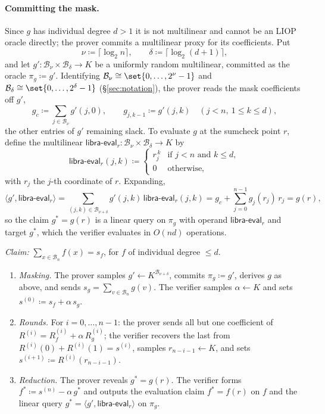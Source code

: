 \documentclass{article}
\theoremstyle{definition}
\newcommand{\BB}{\mathcal{B}}
\begin{document}
\paragraph{Committing the mask.}
Since $g$ has individual degree $d > 1$ it is not multilinear and cannot be an LIOP oracle directly; the prover commits a multilinear proxy for its coefficients. Put
\[
  \nu \coloneqq \lceil \log_2 n \rceil, \qquad \delta \coloneqq \lceil \log_2 (d + 1) \rceil,
\]
and let $g' \colon \BB_\nu \times \BB_\delta \to K$ be a uniformly random multilinear, committed as the oracle $\pi_g \coloneqq g'$. Identifying $\BB_\nu \cong \set{0, \ldots, 2^\nu - 1}$ and $\BB_\delta \cong \set{0, \ldots, 2^\delta - 1}$ (\S\ref{sec:notation}), the prover reads the mask coefficients off $g'$,
\[
  g_c \coloneqq \sum_{j \in \BB_\nu} g'(j, 0), \qquad g_{j, k - 1} \coloneqq g'(j, k) \quad (j < n,\ 1 \le k \le d),
\]
the other entries of $g'$ remaining slack. To evaluate $g$ at the sumcheck point $r$, define the multilinear $\textsf{libra-eval}_r \colon \BB_\nu \times \BB_\delta \to K$ by
\[
  \textsf{libra-eval}_r(j, k) \coloneqq \begin{cases} r_j^{\,k} & \text{if } j < n \text{ and } k \le d, \\ 0 & \text{otherwise,} \end{cases}
\]
with $r_j$ the $j$-th coordinate of $r$. Expanding,
\[
  \langle g', \textsf{libra-eval}_r \rangle = \sum_{(j, k) \in \BB_{\nu + \delta}} g'(j, k)\, \textsf{libra-eval}_r(j, k) = g_c + \sum_{j = 0}^{n - 1} g_j(r_j)\, r_j = g(r),
\]
so the claim $g^* = g(r)$ is a linear query on $\pi_g$ with operand $\textsf{libra-eval}_r$ and target $g^*$, which the verifier evaluates in $O(nd)$ operations.

\begin{protocol}
\label{prot:zk-sumcheck-libra}
\emph{Claim:} $\sum_{x \in \BB_n} f(x) = s_f$, for $f$ of individual degree $\le d$.
\begin{enumerate}
\item \emph{Masking.} The prover samples $g' \gets K^{\BB_{\nu + \delta}}$, commits $\pi_g \coloneqq g'$, derives $g$ as above, and sends $s_g = \sum_{v \in \BB_n} g(v)$. The verifier samples $\alpha \gets K$ and sets $s^{(0)} \coloneqq s_f + \alpha\, s_g$.
\item \emph{Rounds.} For $i = 0, \ldots, n - 1$: the prover sends all but one coefficient of $R^{(i)} = R_f^{(i)} + \alpha\, R_g^{(i)}$; the verifier recovers the last from $R^{(i)}(0) + R^{(i)}(1) = s^{(i)}$, samples $r_{n - i - 1} \gets K$, and sets $s^{(i + 1)} \coloneqq R^{(i)}(r_{n - i - 1})$.
\item \emph{Reduction.} The prover reveals $g^* = g(r)$. The verifier forms $f^* \coloneqq s^{(n)} - \alpha\, g^*$ and outputs the evaluation claim $f^* = f(r)$ on $f$ and the linear query $g^* = \langle g', \textsf{libra-eval}_r \rangle$ on $\pi_g$.
\end{enumerate}
\end{protocol}
\end{document}
